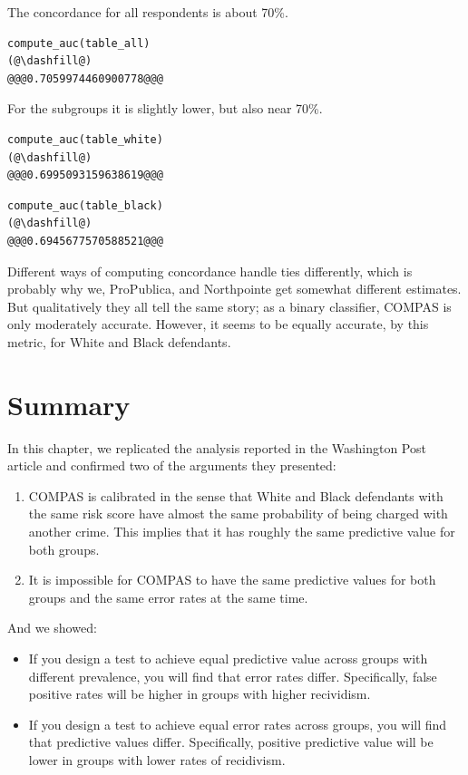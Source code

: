 The concordance for all respondents is about 70\%.

\begin{lstlisting}[]
compute_auc(table_all)
(@\dashfill@)
@@@0.7059974460900778@@@
\end{lstlisting}

For the subgroups it is slightly lower, but also near 70\%.

\begin{lstlisting}[]
compute_auc(table_white)
(@\dashfill@)
@@@0.6995093159638619@@@
\end{lstlisting}

\begin{lstlisting}[]
compute_auc(table_black)
(@\dashfill@)
@@@0.6945677570588521@@@
\end{lstlisting}

Different ways of computing concordance handle ties differently, which
is probably why we, ProPublica, and Northpointe get somewhat different
estimates. But qualitatively they all tell the same story; as a binary
classifier, COMPAS is only moderately accurate. However, it seems to be
equally accurate, by this metric, for White and Black defendants.

\hypertarget{summary}{%
\section{Summary}\label{summary}}

In this chapter, we replicated the analysis reported in the Washington
Post article and confirmed two of the arguments they presented:

\begin{enumerate}
\def\labelenumi{\arabic{enumi}.}
\item
  COMPAS is calibrated in the sense that White and Black defendants with
  the same risk score have almost the same probability of being charged
  with another crime. This implies that it has roughly the same
  predictive value for both groups.
\item
  It is impossible for COMPAS to have the same predictive values for
  both groups and the same error rates at the same time.
\end{enumerate}

And we showed:

\begin{itemize}
\item
  If you design a test to achieve equal predictive value across groups
  with different prevalence, you will find that error rates differ.
  Specifically, false positive rates will be higher in groups with
  higher recividism.
\item
  If you design a test to achieve equal error rates across groups, you
  will find that predictive values differ. Specifically, positive
  predictive value will be lower in groups with lower rates of
  recidivism.
\end{itemize}

